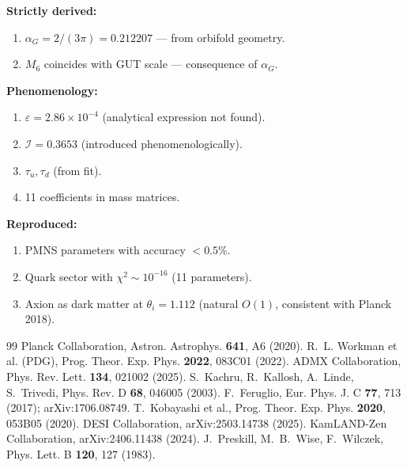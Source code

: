 \documentclass[12pt,a4paper]{article}
\numberwithin{equation}{section}
\begin{document}
\textbf{Strictly derived:}
\begin{enumerate}[leftmargin=1.5em]
\item $\alpha_G = 2/(3\pi) = 0.212207$ — from orbifold geometry.
\item $M_6$ coincides with GUT scale — consequence of $\alpha_G$.
\end{enumerate}

\textbf{Phenomenology:}
\begin{enumerate}[leftmargin=1.5em]
\item $\varepsilon = 2.86\times 10^{-4}$ (analytical expression not found).
\item $\mathcal{I} = 0.3653$ (introduced phenomenologically).
\item $\tau_u, \tau_d$ (from fit).
\item 11 coefficients in mass matrices.
\end{enumerate}

\textbf{Reproduced:}
\begin{enumerate}[leftmargin=1.5em]
\item PMNS parameters with accuracy $<0.5\%$.
\item Quark sector with $\chi^2 \sim 10^{-16}$ (11 parameters).
\item Axion as dark matter at $\theta_i = 1.112$ (natural $O(1)$,
consistent with Planck 2018).
\end{enumerate}

\begin{thebibliography}{99}
 Planck Collaboration, Astron. Astrophys.
\textbf{641}, A6 (2020).
 R.~L. Workman et al. (PDG),
Prog. Theor. Exp. Phys. \textbf{2022}, 083C01 (2022).
 ADMX Collaboration, Phys. Rev. Lett.
\textbf{134}, 021002 (2025).
 S.~Kachru, R.~Kallosh, A.~Linde, S.~Trivedi,
Phys. Rev. D \textbf{68}, 046005 (2003).
 F.~Feruglio, Eur. Phys. J. C \textbf{77},
713 (2017); arXiv:1706.08749.
 T.~Kobayashi et al.,
Prog. Theor. Exp. Phys. \textbf{2020}, 053B05 (2020).
 DESI Collaboration, arXiv:2503.14738 (2025).
 KamLAND-Zen Collaboration,
arXiv:2406.11438 (2024).
 J.~Preskill, M.~B.~Wise, F.~Wilczek,
Phys. Lett. B \textbf{120}, 127 (1983).
\end{thebibliography}
\end{document}
